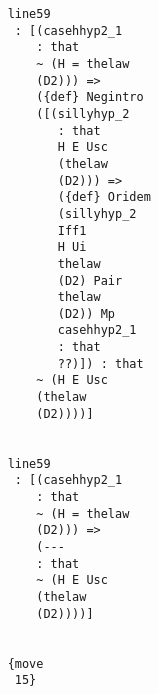 \documentclass[12pt]{article}
\begin{document}
\begin{verbatim}
                                                line59 
                                                 : [(casehhyp2_1 
                                                    : that 
                                                    ~ (H = thelaw 
                                                    (D2))) => 
                                                    ({def} Negintro 
                                                    ([(sillyhyp_2 
                                                       : that 
                                                       H E Usc 
                                                       (thelaw 
                                                       (D2))) => 
                                                       ({def} Oridem 
                                                       (sillyhyp_2 
                                                       Iff1 
                                                       H Ui 
                                                       thelaw 
                                                       (D2) Pair 
                                                       thelaw 
                                                       (D2)) Mp 
                                                       casehhyp2_1 
                                                       : that 
                                                       ??)]) : that 
                                                    ~ (H E Usc 
                                                    (thelaw 
                                                    (D2))))]


                                                line59 
                                                 : [(casehhyp2_1 
                                                    : that 
                                                    ~ (H = thelaw 
                                                    (D2))) => 
                                                    (--- 
                                                    : that 
                                                    ~ (H E Usc 
                                                    (thelaw 
                                                    (D2))))]


                                                {move 
                                                 15}


\end{verbatim}
\end{document}
